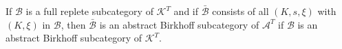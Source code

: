 If $\mathcal{B}$ is a full replete subcategory of $\mathcal{K}^T$ and if $\bar{\mathcal{B}}$ consists of all $(K, s, \xi)$ with $(K, \xi)$ in $\mathcal{B}$, then $\bar{\mathcal{B}}$ is an abstract Birkhoff subcategory of $\mathcal{A}^T$ if $\mathcal{B}$ is an abstract Birkhoff subcategory of $\mathcal{K}^T$.
